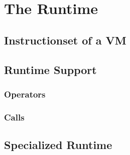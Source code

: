 \chapter{The \rift Runtime}

\section{Instructionset of a VM}

\section{Runtime Support}

\subsection{Operators}

\subsection{Calls}

\section{Specialized Runtime}
